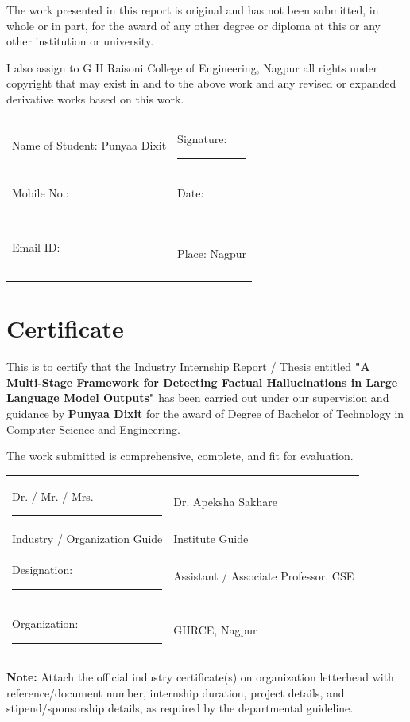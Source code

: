 \documentclass[12pt,a4paper]{report}
\begin{document}
The work presented in this report is original and has not been submitted, in whole or in part,
for the award of any other degree or diploma at this or any other institution or university.

I also assign to G H Raisoni College of Engineering, Nagpur all rights under copyright that may
exist in and to the above work and any revised or expanded derivative works based on this work.

\vspace{1cm}
\begin{tabular}{p{} p{}}
Name of Student: Punyaa Dixit & Signature: \rule{5cm}{0.4pt} \\
Mobile No.: \rule{5cm}{0.4pt} & Date: \rule{5cm}{0.4pt} \\
Email ID: \rule{5cm}{0.4pt} & Place: Nagpur \\
\end{tabular}

\chapter*{Certificate}
This is to certify that the Industry Internship Report / Thesis entitled
\textbf{"A Multi-Stage Framework for Detecting Factual Hallucinations in Large Language Model Outputs"}
has been carried out under our supervision and guidance by
\textbf{Punyaa Dixit}
for the award of Degree of Bachelor of Technology in Computer Science and Engineering.

The work submitted is comprehensive, complete, and fit for evaluation.

\vspace{1.2cm}
\begin{tabular}{p{} p{}}
Dr. / Mr. / Mrs. \rule{5cm}{0.4pt} & Dr. Apeksha Sakhare \\
Industry / Organization Guide & Institute Guide \\
Designation: \rule{5cm}{0.4pt} & Assistant / Associate Professor, CSE \\
Organization: \rule{5cm}{0.4pt} & GHRCE, Nagpur \\
\end{tabular}

\vspace{1.0cm}
\noindent\textbf{Note:} Attach the official industry certificate(s) on organization letterhead with
reference/document number, internship duration, project details, and stipend/sponsorship details,
as required by the departmental guideline.
\end{document}
